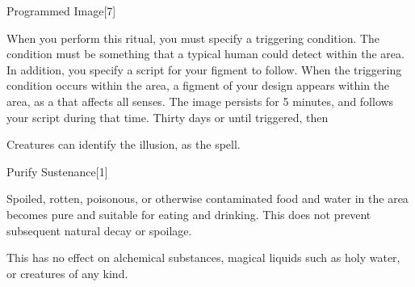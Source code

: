 \begin{spellsection}{Programmed Image}[7]
    \begin{spellheader}
    \end{spellheader}
    \begin{spellcontent}
        \begin{spelltargetinginfo}
        \end{spelltargetinginfo}
        \begin{spelleffects}
            \spellspecial When you perform this ritual, you must specify a triggering condition. The condition must be something that a typical human could detect within the area. In addition, you specify a script for your figment to follow.
            \spelleffect When the triggering condition occurs within the area, a figment of your design appears within the area, as a  that affects all senses. The image persists for 5 minutes, and follows your script during that time.
            \spelldur Thirty days or until triggered, then \durmed
        \end{spelleffects}
    \end{spellcontent}
    \begin{spellfooter}
        \spellnotes Creatures can identify the illusion, as the  spell.
    \end{spellfooter}
\end{spellsection}

\begin{spellsection}{Purify Sustenance}[1]
    \begin{spellheader}
    \end{spellheader}
    \begin{spellcontent}
        \begin{spelltargetinginfo}
        \end{spelltargetinginfo}
        \begin{spelleffects}
            \spelleffect Spoiled, rotten, poisonous, or otherwise contaminated food and water in the area becomes pure and suitable for eating and drinking. This does not prevent subsequent natural decay or spoilage.
        \end{spelleffects}
    \end{spellcontent}
    \begin{spellfooter}
        \spellnotes This has no effect on alchemical substances, magical liquids such as holy water, or creatures of any kind.
    \end{spellfooter}
\end{spellsection}

